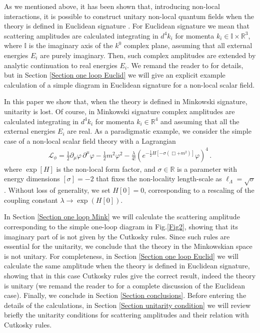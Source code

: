 \documentclass[a4paper,11pt]{article}
\newcommand{\be}{\begin{eqnarray}}
\newcommand{\ee}{\end{eqnarray}}
\begin{document}
As we mentioned above, it has been shown that, introducing non-local interactions, it is possible to construct unitary non-local quantum fields when the theory is defined  in  Euclidean signature \cite{unitarity1,unitarity2,unitarity3}. For Euclidean signature we mean that scattering amplitudes are calculated integrating in $d^4 k_i$ for momenta $k_i\in \mathbb{I}\times \mathbb{R}^3$, where $\mathbb{I}$ is the imaginary axis of the $k^0$ complex plane, assuming that all external energies $E_i$ are purely imaginary. Then, such complex amplitudes are extended by analytic continuation to real energies $E_i$. We remand the reader to \cite{unitarity1,unitarity2,unitarity3} for details, but in Section \ref{Section one loop Euclid} we will give an explicit example calculation of a simple diagram in Euclidean signature for a non-local scalar field.

In this paper we show that, when the theory is defined in Minkowski signature, unitarity is lost. Of course, in Minkowski  signature complex amplitudes are calculated integrating in $d^4 k_i$ for momenta $k_i\in  \mathbb{R}^4$ and assuming that all the external energies $E_i$ are real. As a paradigmatic example, we consider the simple case of a non-local scalar field theory with a Lagrangian
\be
\mathcal{L}_{\phi} = \frac{1}{2} \partial_\mu \varphi \, \partial^\mu \varphi - \frac{1}{2} m^2 \varphi^2 -  \frac{\lambda}{4!} (  e^{ - \frac{1}{2} H[- \sigma (\Box+m^2)] } \varphi )^4 \, .
\label{phin2}
\ee
where $\exp [H]$ is the non-local form factor, and  $\sigma \in \mathbb{R}$ is a parameter with energy dimensions $[\sigma] = - 2$ that fixes  the non-locality length-scale as $\ell_\Lambda = \sqrt{\sigma}$.  Without loss of generality, we set  $H\left[0\right]=0$, corresponding to a rescaling of the coupling constant $\lambda \rightarrow \exp\left(H\left[0\right]\right)$.

In Section \ref{Section one loop Mink} we will calculate  the scattering amplitude corresponding to the simple one-loop diagram in Fig.\ref{Fig2}, showing that its imaginary part of is not given by the Cutkosky rules. Since such rules are essential for the unitarity, we conclude that the theory in the Minkowskian space is not unitary. For completeness, in Section \ref{Section one loop Euclid} we will calculate the same amplitude when the theory is defined in Euclidean signature, showing that in this case Cutkosky rules give the correct result, indeed the theory is unitary (we remand the reader to \cite{unitarity1,unitarity2,unitarity3} for a complete discussion of the Euclidean case). Finally, we conclude in Section \ref{Section conclusions}.
Before entering  the details of the calculations, in Section \ref{Section unitarity condition} we will review briefly  the unitarity conditions for scattering amplitudes and their relation with Cutkosky rules.
\end{document}
